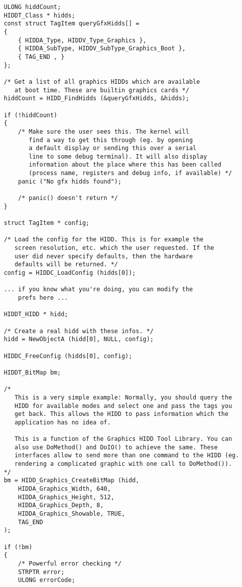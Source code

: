 \begin{verbatim}
	ULONG hiddCount;
	HIDDT_Class * hidds;
	const struct TagItem queryGfxHidds[] =
	{
	    { HIDDA_Type, HIDDV_Type_Graphics },
	    { HIDDA_SubType, HIDDV_SubType_Graphics_Boot },
	    { TAG_END , }
	};

	/* Get a list of all graphics HIDDs which are available
	   at boot time. These are builtin graphics cards */
	hiddCount = HIDD_FindHidds (&queryGfxHidds, &hidds);

	if (!hiddCount)
	{
	    /* Make sure the user sees this. The kernel will
	       find a way to get this through (eg. by opening
	       a default display or sending this over a serial
	       line to some debug terminal). It will also display
	       information about the place where this has been called
	       (process name, registers and debug info, if available) */
	    panic ("No gfx hidds found");

	    /* panic() doesn't return */
	}

	struct TagItem * config;

	/* Load the config for the HIDD. This is for example the
	   screen resolution, etc. which the user requested. If the
	   user did never specify defaults, then the hardware
	   defaults will be returned. */
	config = HIDDC_LoadConfig (hidds[0]);

	... if you know what you're doing, you can modify the
	    prefs here ...

	HIDDT_HIDD * hidd;

	/* Create a real hidd with these infos. */
	hidd = NewObjectA (hidd[0], NULL, config);

	HIDDC_FreeConfig (hidds[0], config);

	HIDDT_BitMap bm;

	/*
	   This is a very simple example: Normally, you should query the
	   HIDD for available modes and select one and pass the tags you
	   get back. This allows the HIDD to pass information which the
	   application has no idea of.

	   This is a function of the Graphics HIDD Tool Library. You can
	   also use DoMethod() and DoIO() to achieve the same. These
	   interfaces allow to send more than one command to the HIDD (eg.
	   rendering a complicated graphic with one call to DoMethod()).
	*/
	bm = HIDD_Graphics_CreateBitMap (hidd,
		HIDDA_Graphics_Width, 640,
		HIDDA_Graphics_Height, 512,
		HIDDA_Graphics_Depth, 8,
		HIDDA_Graphics_Showable, TRUE,
		TAG_END
	);

	if (!bm)
	{
	    /* Powerful error checking */
	    STRPTR error;
	    ULONG errorCode;


\end{verbatim}

